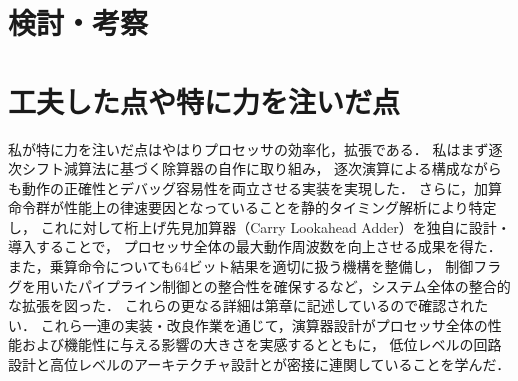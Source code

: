 \documentclass[autodetect-engine,dvi=dvipdfmx,ja=standard,
               a4j,11pt]{bxjsarticle}
\begin{document}
\section{検討・考察}
\section{工夫した点や特に力を注いだ点}
私が特に力を注いだ点はやはりプロセッサの効率化，拡張である．
私はまず逐次シフト減算法に基づく除算器の自作に取り組み，
逐次演算による構成ながらも動作の正確性とデバッグ容易性を両立させる実装を実現した．
さらに，加算命令群が性能上の律速要因となっていることを静的タイミング解析により特定し，
これに対して桁上げ先見加算器（Carry Lookahead Adder）を独自に設計・導入することで，
プロセッサ全体の最大動作周波数を向上させる成果を得た．また，乗算命令についても64ビット結果を適切に扱う機構を整備し，
制御フラグを用いたパイプライン制御との整合性を確保するなど，システム全体の整合的な拡張を図った．
これらの更なる詳細は第章に記述しているので確認されたい．
これら一連の実装・改良作業を通じて，演算器設計がプロセッサ全体の性能および機能性に与える影響の大きさを実感するとともに，
低位レベルの回路設計と高位レベルのアーキテクチャ設計とが密接に連関していることを学んだ．
\end{document}
